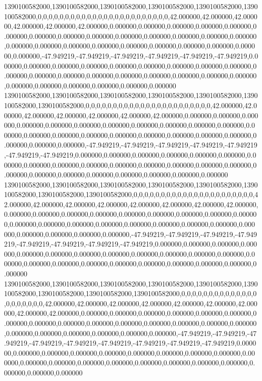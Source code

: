 1390100582000,1390100582000,1390100582000,1390100582000,1390100582000,1390100582000,0,0,0,0,0,0,0,0,0,0,0,0,0,0,0,0,0,0,0,0,0,0,0,0,42.000000,42.000000,42.000000,42.000000,42.000000,42.000000,0.000000,0.000000,0.000000,0.000000,0.000000,0.000000,0.000000,0.000000,0.000000,0.000000,0.000000,0.000000,0.000000,0.000000,0.000000,0.000000,0.000000,0.000000,0.000000,0.000000,0.000000,0.000000,0.000000,0.000000,-47.949219,-47.949219,-47.949219,-47.949219,-47.949219,-47.949219,0.000000,0.000000,0.000000,0.000000,0.000000,0.000000,0.000000,0.000000,0.000000,0.000000,0.000000,0.000000,0.000000,0.000000,0.000000,0.000000,0.000000,0.000000,0.000000,0.000000,0.000000,0.000000,0.000000,0.000000
1390100582000,1390100582000,1390100582000,1390100582000,1390100582000,1390100582000,1390100582000,0,0,0,0,0,0,0,0,0,0,0,0,0,0,0,0,0,0,0,0,0,0,0,42.000000,42.000000,42.000000,42.000000,42.000000,42.000000,42.000000,0.000000,0.000000,0.000000,0.000000,0.000000,0.000000,0.000000,0.000000,0.000000,0.000000,0.000000,0.000000,0.000000,0.000000,0.000000,0.000000,0.000000,0.000000,0.000000,0.000000,0.000000,0.000000,0.000000,-47.949219,-47.949219,-47.949219,-47.949219,-47.949219,-47.949219,-47.949219,0.000000,0.000000,0.000000,0.000000,0.000000,0.000000,0.000000,0.000000,0.000000,0.000000,0.000000,0.000000,0.000000,0.000000,0.000000,0.000000,0.000000,0.000000,0.000000,0.000000,0.000000,0.000000,0.000000
1390100582000,1390100582000,1390100582000,1390100582000,1390100582000,1390100582000,1390100582000,1390100582000,0,0,0,0,0,0,0,0,0,0,0,0,0,0,0,0,0,0,0,0,0,0,42.000000,42.000000,42.000000,42.000000,42.000000,42.000000,42.000000,42.000000,0.000000,0.000000,0.000000,0.000000,0.000000,0.000000,0.000000,0.000000,0.000000,0.000000,0.000000,0.000000,0.000000,0.000000,0.000000,0.000000,0.000000,0.000000,0.000000,0.000000,0.000000,0.000000,-47.949219,-47.949219,-47.949219,-47.949219,-47.949219,-47.949219,-47.949219,-47.949219,0.000000,0.000000,0.000000,0.000000,0.000000,0.000000,0.000000,0.000000,0.000000,0.000000,0.000000,0.000000,0.000000,0.000000,0.000000,0.000000,0.000000,0.000000,0.000000,0.000000,0.000000,0.000000
1390100582000,1390100582000,1390100582000,1390100582000,1390100582000,1390100582000,1390100582000,1390100582000,1390100582000,0,0,0,0,0,0,0,0,0,0,0,0,0,0,0,0,0,0,0,0,0,42.000000,42.000000,42.000000,42.000000,42.000000,42.000000,42.000000,42.000000,42.000000,0.000000,0.000000,0.000000,0.000000,0.000000,0.000000,0.000000,0.000000,0.000000,0.000000,0.000000,0.000000,0.000000,0.000000,0.000000,0.000000,0.000000,0.000000,0.000000,0.000000,0.000000,-47.949219,-47.949219,-47.949219,-47.949219,-47.949219,-47.949219,-47.949219,-47.949219,-47.949219,0.000000,0.000000,0.000000,0.000000,0.000000,0.000000,0.000000,0.000000,0.000000,0.000000,0.000000,0.000000,0.000000,0.000000,0.000000,0.000000,0.000000,0.000000,0.000000,0.000000,0.000000

